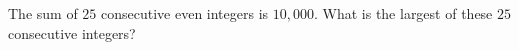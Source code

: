 The sum of $25$ consecutive even integers is $10{,}000$. What is the largest of these $25$ consecutive integers?
